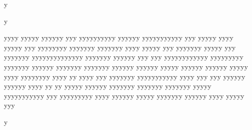 \documentclass[11pt]{article}
\begin{document}
y

y



yyyy yyyyy yyyyyy yyy yyyyyyyyyy yyyyyy yyyyyyyyyyy yyy yyyyy yyyy yyyyy yyy yyyyyyyy yyyyyyy yyyyyyy yyyy yyyyy yyy yyyyyyy yyyyy yyy yyyyyyy yyyyyyyyyyyyyy yyyyyyy yyyyyy yyy yyy yyyyyyyyyyyy  yyyyyyyyy yyyyyyy yyyyyy yyyyyyy yyyyyyy yyyyyy yyyyyy yyyyy yyyyyy yyyyyy yyyyy yyyy yyyyyyyy yyyy yy yyyy yyy yyyyyyy yyyyyyyyyyy yyyy yyy yyy yyyyyy yyyyyy yyyy yy yy yyyyy  yyyyyy yyyyyyy yyyyyyy yyyyyyy yyyyy yyyyyyyyyyy yyy yyyyyyyyy yyyy yyyyyy yyyyy yyyyyyy yyyyyy yyyy yyyyy yyy

y
\end{document}
